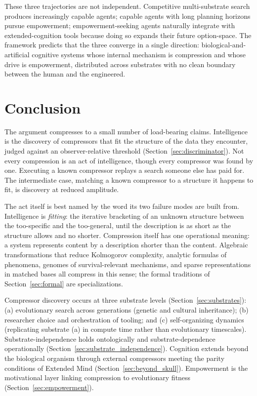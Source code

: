 \documentclass[11pt]{article}
\begin{document}
These three trajectories are not independent. Competitive multi-substrate search produces increasingly capable agents; capable agents with long planning horizons pursue empowerment; empowerment-seeking agents naturally integrate with extended-cognition tools because doing so expands their future option-space. The framework predicts that the three converge in a single direction: biological-and-artificial cognitive systems whose internal mechanism is compression and whose drive is empowerment, distributed across substrates with no clean boundary between the human and the engineered.

\section{Conclusion}\label{sec:conclusion}

The argument compresses to a small number of load-bearing claims. Intelligence is the discovery of compressors that fit the structure of the data they encounter, judged against an observer-relative threshold (Section~\ref{sec:discriminator}). Not every compression is an act of intelligence, though every compressor was found by one. Executing a known compressor replays a search someone else has paid for. The intermediate case, matching a known compressor to a structure it happens to fit, is discovery at reduced amplitude.

The act itself is best named by the word its two failure modes are built from. Intelligence is \emph{fitting}: the iterative bracketing of an unknown structure between the too-specific and the too-general, until the description is as short as the structure allows and no shorter. Compression itself has one operational meaning: a system represents content by a description shorter than the content. Algebraic transformations that reduce Kolmogorov complexity, analytic formulas of phenomena, genomes of survival-relevant mechanisms, and sparse representations in matched bases all compress in this sense; the formal traditions of Section~\ref{sec:formal} are specializations.

Compressor discovery occurs at three substrate levels (Section~\ref{sec:substrates}): (a) evolutionary search across generations (genetic and cultural inheritance); (b) researcher choice and orchestration of tooling; and (c) self-organizing dynamics (replicating substrate (a) in compute time rather than evolutionary timescales). Substrate-independence holds ontologically and substrate-dependence operationally (Section~\ref{sec:substrate_independence}). Cognition extends beyond the biological organism through external compressors meeting the parity conditions of Extended Mind (Section~\ref{sec:beyond_skull}). Empowerment is the motivational layer linking compression to evolutionary fitness (Section~\ref{sec:empowerment}).
\end{document}
